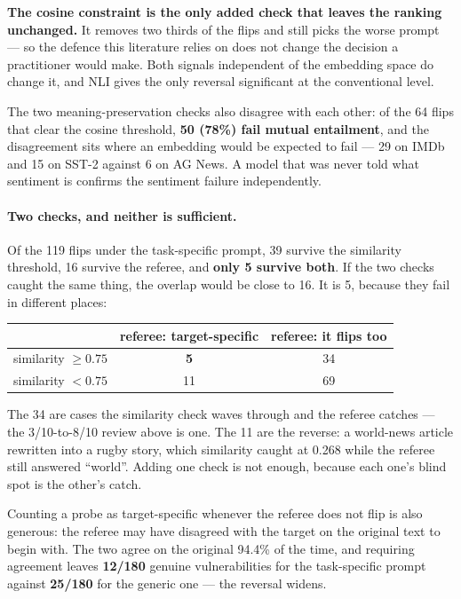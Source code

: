 \documentclass[11pt]{article}
\begin{document}
\noindent \textbf{The cosine constraint is the only added check that leaves the
ranking unchanged.} It removes two thirds of the flips and still picks the worse
prompt --- so the defence this literature relies on does not change the decision
a practitioner would make. Both signals independent of the embedding space do
change it, and NLI gives the only reversal significant at the conventional level.

The two meaning-preservation checks also disagree with each other: of the 64
flips that clear the cosine threshold, \textbf{50 (78\%) fail mutual
entailment}, and the disagreement sits where an embedding would be expected to
fail --- 29 on IMDb and 15 on SST-2 against 6 on AG News. A model that was never
told what sentiment is confirms the sentiment failure independently.

\paragraph{Two checks, and neither is sufficient.}
Of the 119 flips under the task-specific prompt, 39 survive the similarity
threshold, 16 survive the referee, and \textbf{only 5 survive both}. If the two
checks caught the same thing, the overlap would be close to 16. It is 5, because
they fail in different places:

\begin{center}
\begin{tabular}{lcc}
\toprule
& referee: target-specific & referee: it flips too \\
\midrule
similarity $\geq 0.75$ & \textbf{5} & 34 \\
similarity $< 0.75$    & 11 & 69 \\
\bottomrule
\end{tabular}
\end{center}

\noindent The 34 are cases the similarity check waves through and the referee
catches --- the 3/10-to-8/10 review above is one. The 11 are the reverse: a
world-news article rewritten into a rugby story, which similarity caught at 0.268
while the referee still answered ``world''. Adding one check is not enough,
because each one's blind spot is the other's catch.

Counting a probe as target-specific whenever the referee does not flip is also
generous: the referee may have disagreed with the target on the original text to
begin with. The two agree on the original 94.4\% of the time, and requiring
agreement leaves \textbf{12/180} genuine vulnerabilities for the task-specific
prompt against \textbf{25/180} for the generic one --- the reversal widens.
\end{document}
